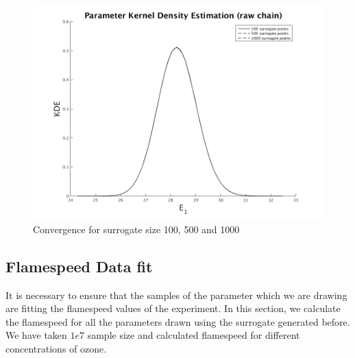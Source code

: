 \begin{figure}[H]
\centering
\includegraphics[scale=0.7]{model_1/conv_surrogate}
    \caption{Convergence for surrogate size 100, 500 and 1000}
\end{figure}


\subsection{Flamespeed Data fit}

 It is necessary to ensure that the samples of the parameter which we are drawing are fitting the flamespeed values of the experiment. In this section, we calculate the flamespeed for all the parameters drawn using the surrogate generated before. We have taken $1e7$ sample size and calculated flamespeed for different concentrations of ozone.

